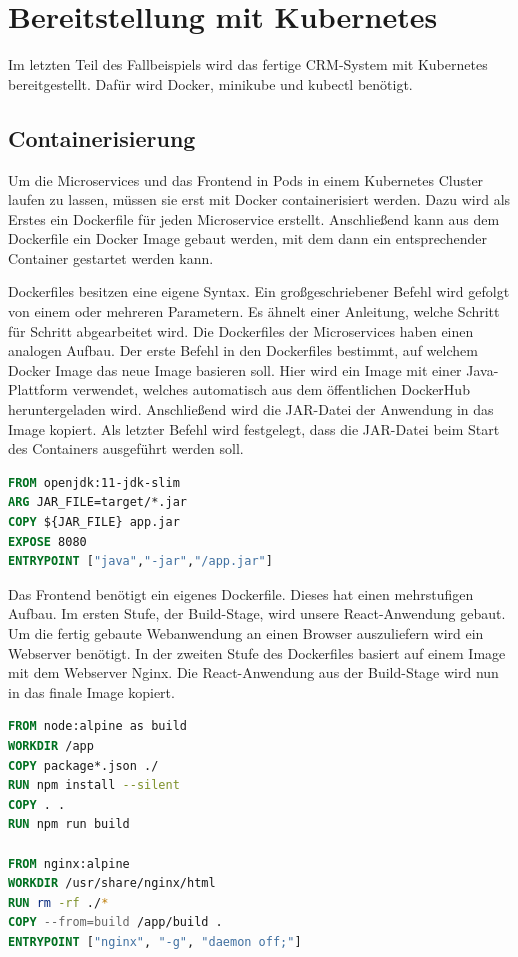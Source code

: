 \clearpage
\section{Bereitstellung mit Kubernetes}

Im letzten Teil des Fallbeispiels wird das fertige CRM-System mit Kubernetes bereitgestellt. Dafür wird Docker, minikube und kubectl benötigt.

\subsection{Containerisierung}

Um die Microservices und das Frontend in Pods in einem Kubernetes Cluster laufen zu lassen, müssen sie erst mit Docker containerisiert werden. Dazu wird als Erstes ein Dockerfile für jeden Microservice erstellt. Anschließend kann aus dem Dockerfile ein Docker Image gebaut werden, mit dem dann ein entsprechender Container gestartet werden kann.

Dockerfiles besitzen eine eigene Syntax. Ein großgeschriebener Befehl wird gefolgt von einem oder mehreren Parametern. Es ähnelt einer Anleitung, welche Schritt für Schritt abgearbeitet wird. Die Dockerfiles der Microservices haben einen analogen Aufbau. Der erste Befehl in den Dockerfiles bestimmt, auf welchem Docker Image das neue Image basieren soll. Hier wird ein Image mit einer Java-Plattform verwendet, welches automatisch aus dem öffentlichen DockerHub heruntergeladen wird. Anschließend wird die \acs{JAR}-Datei der Anwendung in das Image kopiert. Als letzter Befehl wird festgelegt, dass die \acs{JAR}-Datei beim Start des Containers ausgeführt werden soll.

\begin{lstlisting}[language=dockerfile, caption=Dockerfile für Kontakt-Microservice]
FROM openjdk:11-jdk-slim
ARG JAR_FILE=target/*.jar
COPY ${JAR_FILE} app.jar
EXPOSE 8080
ENTRYPOINT ["java","-jar","/app.jar"]
\end{lstlisting}

Das Frontend benötigt ein eigenes Dockerfile. Dieses hat einen mehrstufigen Aufbau. Im ersten Stufe, der Build-Stage, wird unsere React-Anwendung gebaut. Um die fertig gebaute Webanwendung an einen Browser auszuliefern wird ein Webserver benötigt. In der zweiten Stufe des Dockerfiles basiert auf einem Image mit dem Webserver Nginx. Die React-Anwendung aus der Build-Stage wird nun in das finale Image kopiert.

\begin{lstlisting}[language=dockerfile, caption=Dockerfile für Frontend]
FROM node:alpine as build
WORKDIR /app
COPY package*.json ./
RUN npm install --silent
COPY . .
RUN npm run build

FROM nginx:alpine
WORKDIR /usr/share/nginx/html
RUN rm -rf ./*
COPY --from=build /app/build .
ENTRYPOINT ["nginx", "-g", "daemon off;"]
\end{lstlisting}


